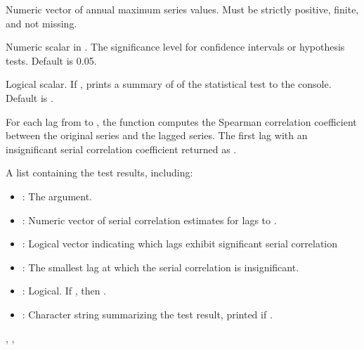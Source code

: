\documentclass[a4paper]{book}
\begin{document}
%
\begin{Arguments}
\begin{ldescription}
\item[\code{data}] Numeric vector of annual maximum series values.
Must be strictly positive, finite, and not missing.

\item[\code{alpha}] Numeric scalar in \eqn{[0.01, 0.1]}{}. The significance
level for confidence intervals or hypothesis tests. Default is 0.05.

\item[\code{quiet}] Logical scalar. If , prints a summary of of the statistical
test to the console. Default is .
\end{ldescription}
\end{Arguments}
%
\begin{Details}
For each lag from  to , the function computes the Spearman
correlation coefficient between the original series and the lagged series. The
first lag with an insignificant serial correlation coefficient returned as .
\end{Details}
%
\begin{Value}
A list containing the test results, including:
\begin{itemize}

\item{} : The  argument.
\item{} : Numeric vector of serial correlation estimates for lags  to .
\item{} : Logical vector indicating which lags exhibit significant serial correlation
\item{} : The smallest lag at which the serial correlation is insignificant.
\item{} : Logical. If , then .
\item{} : Character string summarizing the test result, printed if .

\end{itemize}

\end{Value}
%
\begin{SeeAlso}
, , 
\end{SeeAlso}
\end{document}
